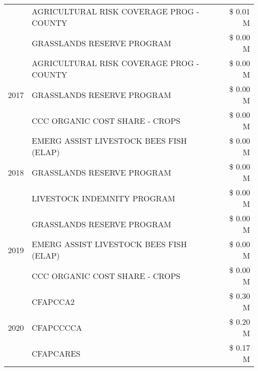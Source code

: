 \begin{tabular}{llr}
 & AGRICULTURAL RISK COVERAGE PROG - COUNTY & \$ 0.01 M \\
 & GRASSLANDS RESERVE PROGRAM & \$ 0.00 M \\
\cline{1-3}
\multirow[t]{3}{*}{2017} & AGRICULTURAL RISK COVERAGE PROG - COUNTY & \$ 0.00 M \\
 & GRASSLANDS RESERVE PROGRAM & \$ 0.00 M \\
 & CCC ORGANIC COST SHARE - CROPS & \$ 0.00 M \\
\cline{1-3}
\multirow[t]{3}{*}{2018} & EMERG ASSIST LIVESTOCK BEES FISH (ELAP) & \$ 0.00 M \\
 & GRASSLANDS RESERVE PROGRAM & \$ 0.00 M \\
 & LIVESTOCK INDEMNITY PROGRAM & \$ 0.00 M \\
\cline{1-3}
\multirow[t]{3}{*}{2019} & GRASSLANDS RESERVE PROGRAM & \$ 0.00 M \\
 & EMERG ASSIST LIVESTOCK BEES FISH (ELAP) & \$ 0.00 M \\
 & CCC ORGANIC COST SHARE - CROPS & \$ 0.00 M \\
\cline{1-3}
\multirow[t]{3}{*}{2020} & CFAPCCA2 & \$ 0.30 M \\
 & CFAPCCCCA & \$ 0.20 M \\
 & CFAPCARES & \$ 0.17 M \\
\cline{1-3}
\bottomrule
\end{tabular}
